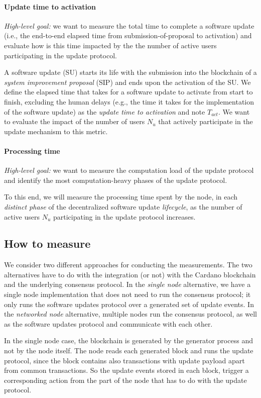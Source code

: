 \paragraph{Update time to activation}
\emph{High-level goal:} we want to measure the total time to complete a software
update (i.e., the end-to-end elapsed time from submission-of-proposal to
activation) and evaluate how is this time impacted by the the number of active
users participating in the update protocol.

A software update (SU) starts its life with the submission into the blockchain
of a \emph{system improvement proposal} (SIP) and ends upon the activation of
the SU. We define the elapsed time that takes for a software update to activate
from start to finish, excluding the human delays (e.g., the time it takes for
the implementation of the software update) as the \emph{update time to
  activation} and note $T_{act}$. We want to evaluate the impact of the number
of users $N_u$ that actively participate in the update mechanism to this metric.

\paragraph{Processing time}
\emph{High-level goal:} we want to measure the computation load of the update
protocol and identify the most computation-heavy phases of the update protocol.

To this end, we will measure the processing time spent by the node, in each
\emph{distinct phase} of the decentralized software update \emph{lifecycle}, as
the number of active users $N_u$ participating in the update protocol increases.

\subsection{How to measure}
We consider two different approaches for conducting the measurements. The two
alternatives have to do with the integration (or not) with the Cardano
blockchain and the underlying consensus protocol. In the \emph{single node}
alternative, we have a single node implementation that does not need to run the
consensus protocol; it only runs the software updates protocol over a generated
set of update events. In the \emph{networked node} alternative, multiple nodes
run the consensus protocol, as well as the software updates protocol and
communicate with each other.

In the single node case, the blockchain is generated by the generator process
and not by the node itself. The node reads each generated block and runs the
update protocol, since the block contains also transactions with update payload
apart from common transactions. So the update events stored in each block,
trigger a corresponding action from the part of the node that has to do with the
update protocol.

